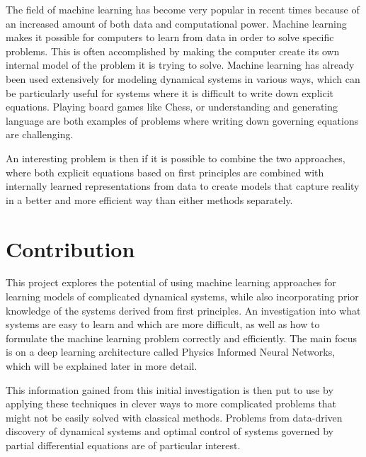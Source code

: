 The field of machine learning has become very popular in recent times because of an increased amount of both data and computational power. Machine learning makes it possible for computers to learn from data in order to solve specific problems. This is often accomplished by making the computer create its own internal model of the problem it is trying to solve. Machine learning has already been used extensively for modeling dynamical systems in various ways, which can be particularly useful for systems where it is difficult to write down explicit equations. Playing board games like Chess, or understanding and generating language are both examples of problems where writing down governing equations are challenging.

An interesting problem is then if it is possible to combine the two approaches, where both explicit equations based on first principles are combined with internally learned representations from data to create models that capture reality in a better and more efficient way than either methods separately.

\section{Contribution}

This project explores the potential of using machine learning approaches for learning models of complicated dynamical systems, while also incorporating prior knowledge of the systems derived from first principles. An investigation into what systems are easy to learn and which are more difficult, as well as how to formulate the machine learning problem correctly and efficiently. The main focus is on a deep learning architecture called Physics Informed Neural Networks, which will be explained later in more detail.

This information gained from this initial investigation is then put to use by applying these techniques in clever ways to more complicated problems that might not be easily solved with classical methods. Problems from data-driven discovery of dynamical systems and optimal control of systems governed by partial differential equations are of particular interest.

